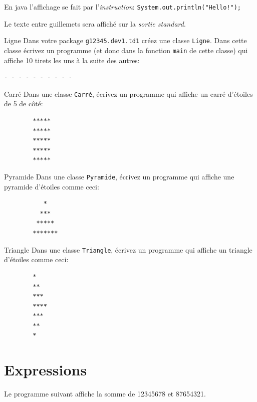\documentclass[a4paper,11pt]{article}
\begin{document}
	En java l'affichage se fait par l'\emph{instruction}: \texttt{System.out.println("Hello!");}
	
	Le texte entre guillemets sera affiché sur la \emph{sortie standard}.



	\begin{Exercice}{Ligne}
		Dans votre package \texttt{g12345.dev1.td1} créez une classe \texttt{Ligne}.
		Dans cette classe écrivez un programme  (et donc dans la fonction \texttt{main} de cette classe) 
		qui affiche 10 tirets les uns à la suite des autres:

		\texttt{- - - - - - - - - -}
	\end{Exercice}
	
	\begin{Exercice}{Carré}
		Dans une classe \texttt{Carré}, écrivez un programme qui affiche un carré d'étoiles de 5 de côté:

		\begin{verbatim}
		*****
		*****
		*****
		*****
		*****
		\end{verbatim}
	\end{Exercice}

	\begin{Exercice}{Pyramide}
		Dans une classe \texttt{Pyramide}, écrivez un programme qui affiche une pyramide d'étoiles comme ceci:

		\begin{verbatim}
		   *
		  ***
		 *****
		*******
		\end{verbatim}
	\end{Exercice}

	\begin{Exercice}{Triangle}
		Dans une classe \texttt{Triangle}, écrivez un programme qui affiche un triangle d'étoiles comme ceci:

		\begin{verbatim}
		*
		**
		***
		****
		***
		**
		*
		\end{verbatim}
	\end{Exercice}




\section{Expressions}

	Le programme suivant affiche la somme de 12345678 et 87654321.
	
\end{document}
